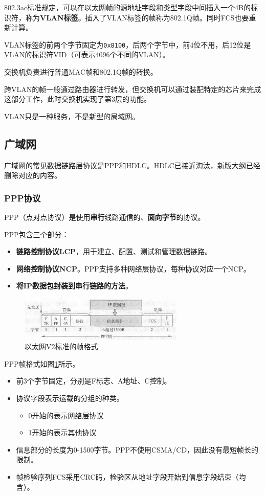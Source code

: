\documentclass[12pt, a4paper, oneside]{ctexart}
\begin{document}
802.3ac标准规定，可以在以太网帧的源地址字段和类型字段中间插入一个4B的标识符，称为\textbf{VLAN标签}。插入了VLAN标签的帧称为802.1Q帧。同时FCS也要重新计算。

VLAN标签的前两个字节固定为\verb|0x8100|，后两个字节中，前4位不用，后12位是VLAN的标识符VID（可表示4096个不同的VLAN）。

交换机负责进行普通MAC帧和802.1Q帧的转换。

跨VLAN的帧一般通过路由器进行转发，但交换机可以通过装配特定的芯片来完成这部分工作，此时交换机实现了第3层的功能。

VLAN只是一种服务，不是新型的局域网。

\subsection{广域网}

广域网的常见数据链路层协议是PPP和HDLC。HDLC已接近淘汰，新版大纲已经删除对应的内容。

\subsubsection{PPP协议}

PPP（点对点协议）是使用\textbf{串行}线路通信的、\textbf{面向字节}的协议。

PPP包含三个部分：
\begin{itemize}
    \item {\bf 链路控制协议LCP}，用于建立、配置、测试和管理数据链路。
    \item {\bf 网络控制协议NCP}。PPP支持多种网络层协议，每种协议对应一个NCP。
    \item {\bf 将IP数据包封装到串行链路的方法}。
\end{itemize}

\begin{figure}[h]
    \centering
    \includegraphics[width=0.7\textwidth]{./images/ppp-frame.jpg}
    \caption{以太网V2标准的帧格式}
    \label{ppp-frame}
\end{figure}

PPP帧格式如图\ref{ppp-frame}所示。
\begin{itemize}
    \item 前3个字节固定，分别是F标志、A地址、C控制。
    \item 协议字段表示运载的分组的种类。
    \begin{itemize}
        \item 0开始的表示网络层协议
        \item 1开始的表示其他协议
    \end{itemize}
    \item 信息部分的长度为0-1500字节。PPP不使用CSMA/CD，因此没有最短帧长的限制。
    \item 帧检验序列FCS采用CRC码，检验区从地址字段开始到信息字段结束（均含）。
\end{itemize}
\end{document}

